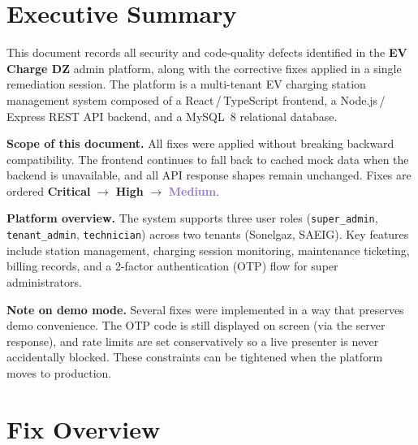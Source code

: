 \documentclass[12pt,a4paper]{report}
\begin{document}
	\tableofcontents
	\clearpage
	
	\chapter{Executive Summary}
	
	This document records all security and code-quality defects identified in the
	\textbf{EV Charge DZ} admin platform, along with the corrective fixes applied
	in a single remediation session. The platform is a multi-tenant EV charging
	station management system composed of a React\,/\,TypeScript frontend, a
	Node.js\,/\,Express REST API backend, and a MySQL~8 relational database.
	
	\begin{tcolorbox}[
		colback  = lightblue,
		colframe = steelblue,
		arc      = 4pt,
		left     = 10pt, right = 10pt, top = 6pt, bottom = 6pt,
		]
		\textbf{Scope of this document.}\enspace
		All fixes were applied without breaking backward compatibility. The frontend
		continues to fall back to cached mock data when the backend is unavailable, and
		all API response shapes remain unchanged. Fixes are ordered
		\textcolor{criticalred}{\textbf{Critical}} $\to$
		\textcolor{highorange}{\textbf{High}} $\to$
		\textcolor{mediumpurple}{\textbf{Medium}}.
	\end{tcolorbox}
	
	\medskip
	
	\textbf{Platform overview.}\enspace
	The system supports three user roles (\texttt{super\_admin},
	\texttt{tenant\_admin}, \texttt{technician}) across two tenants (Sonelgaz,
	SAEIG). Key features include station management, charging session monitoring,
	maintenance ticketing, billing records, and a 2-factor authentication (OTP)
	flow for super administrators.
	
	\textbf{Note on demo mode.}\enspace
	Several fixes were implemented in a way that preserves demo convenience.
	The OTP code is still displayed on screen (via the server response), and rate
	limits are set conservatively so a live presenter is never accidentally blocked.
	These constraints can be tightened when the platform moves to production.
	
	\chapter{Fix Overview}
	
\end{document}

